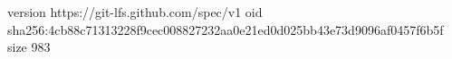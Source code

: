 version https://git-lfs.github.com/spec/v1
oid sha256:4cb88c71313228f9cec008827232aa0e21ed0d025bb43e73d9096af0457f6b5f
size 983
